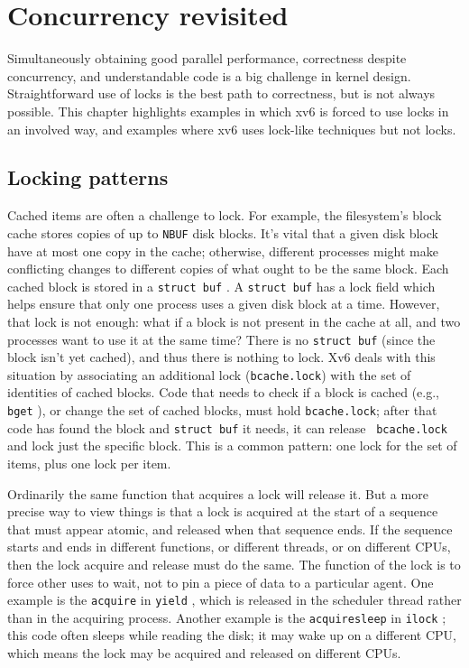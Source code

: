 \chapter{Concurrency revisited}
\label{CH:LOCK2}

Simultaneously obtaining good parallel
performance, correctness despite concurrency, and understandable code
is a big challenge in kernel design.
Straightforward use of locks is the best path to correctness,
but is not always possible.
This
chapter highlights examples in which xv6 is forced to use locks in an
involved way, and examples where xv6 uses lock-like techniques but not
locks.

\section{Locking patterns}

Cached items are often a challenge to lock.
For example,
the filesystem's block cache  stores
copies of up to {\tt NBUF} disk blocks.
It's vital that a given disk block have at most
one copy in the cache; otherwise, different processes might make
conflicting changes to different copies of what ought to be the same
block. Each cached block is stored in a {\tt struct buf}
. A {\tt struct buf} has a lock field which
helps ensure that only one process uses a given disk block at a time.
However, that lock is not enough: what if a block is not present in
the cache at all, and two processes want to use it at the same time?
There is no {\tt struct buf} (since the block isn't yet cached), and
thus there is nothing to lock. Xv6 deals with this situation by
associating an additional lock ({\tt bcache.lock}) with the set of
identities of cached blocks. Code that needs to check if a block is
cached (e.g., {\tt bget} ), or change the
set of cached blocks, must hold {\tt bcache.lock}; after that code has
found the block and {\tt struct buf} it needs, it can release {\tt
  bcache.lock} and lock just the specific block. This is a common
pattern: one lock for the set of items, plus one lock per item.

Ordinarily the same function that acquires a lock will release it. But
a more precise way to view things is that a lock is acquired at the
start of a sequence that must appear atomic, and released when that
sequence ends. If the sequence starts and ends in different functions,
or different threads, or on different CPUs, then the lock acquire and
release must do the same. The function of the lock is to force
other uses to wait, not to pin a piece of data to a particular agent. One
example is the {\tt acquire} in {\tt yield}
, which is released in the scheduler
thread rather than in the acquiring process. Another example is the
{\tt acquiresleep} in {\tt ilock} ; this
code often sleeps while reading the disk; it may wake up on a
different CPU, which means the lock may be acquired
and released on different CPUs.

